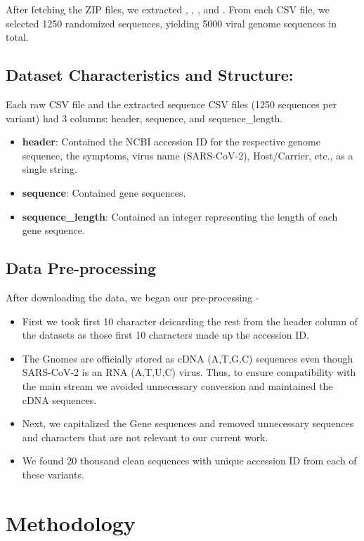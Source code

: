 \documentclass[conference]{IEEEtran}
\begin{document}
{\raggedright After fetching the ZIP files, we extracted , , , and . From each CSV file, we selected 1250 randomized sequences, yielding 5000 viral genome sequences in total.\par}

\subsection{Dataset Characteristics and Structure:}
Each raw CSV file and the extracted sequence CSV files (1250 sequences per variant) had 3 columns: header, sequence, and sequence\_length. 
\begin{itemize}
    \item \textbf{header}: Contained the NCBI accession ID for the respective genome sequence, the symptoms, virus name (SARS-CoV-2), Host/Carrier, etc., as a single string. 
    \item \textbf{sequence}: Contained gene sequences.
    \item \textbf{sequence\_length}: Contained an integer representing the length of each gene sequence.
\end{itemize}

\subsection{Data Pre-processing}
After downloading the data, we began our pre-processing -

\begin{itemize}
    \item First we took first 10 character deicarding the rest from the header column of the datasets as those first 10 characters made up the accession ID.
    \item The Gnomes are officially stored as cDNA (A,T,G,C) sequences even though SARS-CoV-2 is an RNA (A,T,U,C) virus. Thus, to ensure compatibility with the main stream we avoided unnecessary conversion and maintained the cDNA sequences.
    \item Next, we capitalized the Gene sequences and removed unnecessary sequences and characters that are not relevant to our current work. 
    \item We found 20 thousand clean sequences with unique accession ID from each of these variants. 
\end{itemize}


\section{Methodology}
\end{document}
